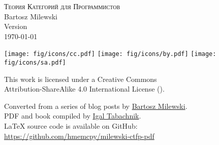 \begin{small}
  \begin{center}

    \textsc{Теория Категорий для Программистов}\\

    \vspace{1.0em}
    \noindent
    Bartosz Milewski\\

    \vspace{1.26em}
    \noindent
    Version \texttt{\OPTversion}\\\today


    \vspace{1.6em}
    \noindent
    \texttt{[image: fig/icons/cc.pdf]}
    \texttt{[image: fig/icons/by.pdf]}
    \texttt{[image: fig/icons/sa.pdf]}

    \vspace{0.4em}
    \noindent
    This work is licensed under a Creative Commons\\
    Attribution-ShareAlike 4.0 International License
    (\href{http://creativecommons.org/licenses/by-sa/4.0/}{}).

    \vspace{1.26em}
    \noindent
    Converted from a series of blog posts by \href{https://bartoszmilewski.com/2014/10/28/category-theory-for-programmers-the-preface/}{Bartosz Milewski}.\\
    PDF and book compiled by \href{https://hmemcpy.com}{Igal Tabachnik}.\\
    \vspace{1.26em}
    \noindent
    \LaTeX{} source code is available on GitHub: \href{https://github.com/hmemcpy/milewski-ctfp-pdf}{https://github.com/hmemcpy/milewski-ctfp-pdf}
  \end{center}
\end{small}

